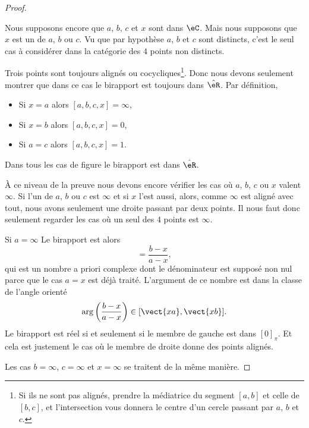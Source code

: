 \begin{proof}
\begin{subproof}
            Nous supposons encore que \( a\), \( b\), \( c\) et \( x\) sont dans \( \eC\). Mais nous supposons que \( x\) est un de \( a\), \( b\) ou \( c\). Vu que par hypothèse \( a\), \( b\) et \( c\) sont distincts, c'est le seul cas à considérer dans la catégorie des \( 4\) points non distincts.

            Trois points sont toujours alignés ou cocycliques\footnote{Si ils ne sont pas alignés, prendre la médiatrice du segment \( [a,b]\) et celle de \( [b,c]\), et l'intersection vous donnera le centre d'un cercle passant par \( a\), \( b\) et \( c\).}. Donc nous devons seulement montrer que dans ce cas le birapport est toujours dans \( \hat \eR\). Par définition,
            \begin{itemize}
                \item Si \( x=a\) alors \( [a,b,c,x]=\infty\),
                \item Si \( x=b\) alors \( [a,b,c,x]=0\),
                \item Si \( a=c\) alors \( [a,b,c,x]=1\).
            \end{itemize}
            Dans tous les cas de figure le birapport est dans \( \hat \eR\).

    \end{subproof}

    À ce niveau de la preuve nous devons encore vérifier les cas où \( a\), \( b\), \( c\) ou \( x\) valent \( \infty\). Si l'un de \( a\), \( b\) ou \( c\) est \( \infty\) et si \( x\) l'est aussi, alors, comme \( \infty\) est aligné avec tout, nous avons seulement une droite passant par deux points. Il nous faut donc seulement regarder les cas où un seul des \( 4\) points est \( \infty\).

    \begin{subproof}
        \item[Si \( a=\infty\)]
            Le birapport est alors
            \begin{equation}
                [\infty,b,c,x]=\frac{ b-x }{ a-x },
            \end{equation}
            qui est un nombre a priori complexe dont le dénominateur est supposé non nul parce que le cas \( a=x\) est déjà traité. L'argument de ce nombre est dans la classe de l'angle orienté
            \begin{equation}
                \arg\left( \frac{ b-x }{ a-x } \right)\in[\vect{ xa },\vect{ xb }].
            \end{equation}
            Le birapport est réel si et seulement si le membre de gauche est dans \( [0]_{\pi}\). Et cela est justement le cas où le membre de droite donne des points alignés.
    \end{subproof}
    Les cas \( b=\infty\), \( c=\infty\) et \( x=\infty\) se traitent de la même manière.
\end{proof}

